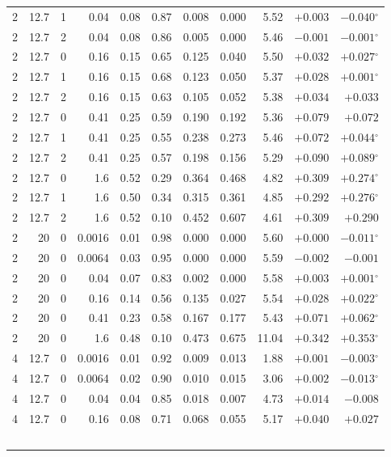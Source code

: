 \documentclass[aps,pra,onecolumn,notitlepage,superscriptaddress,nofootinbib,floatfix]{revtex4-2}
\begin{document}
{\begin{longtable}{@{}rrrrrrrrrrr@{}}
2 & 12.7 & 1 & 0.04 & 0.08 & 0.87 & 0.008 & 0.000 & 5.52 & $+0.003$ & $-0.040$$^{\circ}$ \\
2 & 12.7 & 2 & 0.04 & 0.08 & 0.86 & 0.005 & 0.000 & 5.46 & $-0.001$ & $-0.001$$^{\circ}$ \\
2 & 12.7 & 0 & 0.16 & 0.15 & 0.65 & 0.125 & 0.040 & 5.50 & $+0.032$ & $+0.027$$^{\circ}$ \\
2 & 12.7 & 1 & 0.16 & 0.15 & 0.68 & 0.123 & 0.050 & 5.37 & $+0.028$ & $+0.001$$^{\circ}$ \\
2 & 12.7 & 2 & 0.16 & 0.15 & 0.63 & 0.105 & 0.052 & 5.38 & $+0.034$ & $+0.033$ \\
2 & 12.7 & 0 & 0.41 & 0.25 & 0.59 & 0.190 & 0.192 & 5.36 & $+0.079$ & $+0.072$ \\
2 & 12.7 & 1 & 0.41 & 0.25 & 0.55 & 0.238 & 0.273 & 5.46 & $+0.072$ & $+0.044$$^{\circ}$ \\
2 & 12.7 & 2 & 0.41 & 0.25 & 0.57 & 0.198 & 0.156 & 5.29 & $+0.090$ & $+0.089$$^{\circ}$ \\
2 & 12.7 & 0 & 1.6 & 0.52 & 0.29 & 0.364 & 0.468 & 4.82 & $+0.309$ & $+0.274$$^{\circ}$ \\
2 & 12.7 & 1 & 1.6 & 0.50 & 0.34 & 0.315 & 0.361 & 4.85 & $+0.292$ & $+0.276$$^{\circ}$ \\
2 & 12.7 & 2 & 1.6 & 0.52 & 0.10 & 0.452 & 0.607 & 4.61 & $+0.309$ & $+0.290$ \\
2 & 20 & 0 & 0.0016 & 0.01 & 0.98 & 0.000 & 0.000 & 5.60 & $+0.000$ & $-0.011$$^{\circ}$ \\
2 & 20 & 0 & 0.0064 & 0.03 & 0.95 & 0.000 & 0.000 & 5.59 & $-0.002$ & $-0.001$ \\
2 & 20 & 0 & 0.04 & 0.07 & 0.83 & 0.002 & 0.000 & 5.58 & $+0.003$ & $+0.001$$^{\circ}$ \\
2 & 20 & 0 & 0.16 & 0.14 & 0.56 & 0.135 & 0.027 & 5.54 & $+0.028$ & $+0.022$$^{\circ}$ \\
2 & 20 & 0 & 0.41 & 0.23 & 0.58 & 0.167 & 0.177 & 5.43 & $+0.071$ & $+0.062$$^{\circ}$ \\
2 & 20 & 0 & 1.6 & 0.48 & 0.10 & 0.473 & 0.675 & 11.04 & $+0.342$ & $+0.353$$^{\circ}$ \\
4 & 12.7 & 0 & 0.0016 & 0.01 & 0.92 & 0.009 & 0.013 & 1.88 & $+0.001$ & $-0.003$$^{\circ}$ \\
4 & 12.7 & 0 & 0.0064 & 0.02 & 0.90 & 0.010 & 0.015 & 3.06 & $+0.002$ & $-0.013$$^{\circ}$ \\
4 & 12.7 & 0 & 0.04 & 0.04 & 0.85 & 0.018 & 0.007 & 4.73 & $+0.014$ & $-0.008$ \\
4 & 12.7 & 0 & 0.16 & 0.08 & 0.71 & 0.068 & 0.055 & 5.17 & $+0.040$ & $+0.027$ \\
$$
\end{longtable}}
\end{document}
